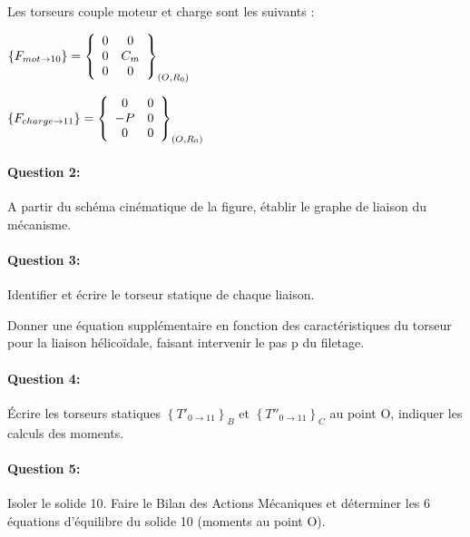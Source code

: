 Les torseurs couple moteur et charge sont les suivants :\\
  \begin{minipage}{0.3\linewidth}
  \begin{math}
  \left\{F_{mot \rightarrow 10}\right\}=\left\{
  \begin{array}{c c}
  0 & 0 \\
  0 & C_m \\
  0 & 0
  \end{array}\right\}_{(O,R_0)}
  \end{math}
  \end{minipage}
  \hfill
  \begin{minipage}{0.3\linewidth}
  \begin{math}
  \left\{F_{charge \rightarrow 11}\right\}=\left\{
  \begin{array}{c c}
  0 & 0 \\
  -P & 0 \\
  0 & 0
  \end{array}\right\}_{(O,R_0)}
  \end{math}
\end{minipage}


\paragraph{Question 2:} A partir du schéma cinématique de la figure, établir le graphe de liaison du mécanisme.

\vspace{3cm}

\paragraph{Question 3:} Identifier et écrire le torseur statique de chaque liaison.

\reponse[6]

Donner une équation supplémentaire en fonction des caractéristiques du torseur pour la liaison hélicoïdale, faisant intervenir le pas p du filetage.

\paragraph{Question 4:} Écrire les torseurs statiques $\left\{T'_{0 \rightarrow 11}\right\}_B$ et $\left\{T''_{0 \rightarrow 11}\right\}_C$ au point O, indiquer les calculs des moments.

\reponse[8]

\paragraph{Question 5:} Isoler le solide 10. Faire le Bilan des Actions Mécaniques et déterminer les 6 équations d'équilibre du solide 10 (moments au point O).

